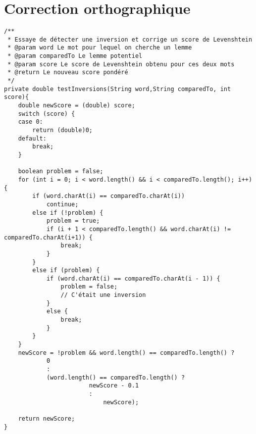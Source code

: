 \chapter{Correction orthographique}\label{corr}

\java
\begin{lstlisting}
/**
 * Essaye de détecter une inversion et corrige un score de Levenshtein
 * @param word Le mot pour lequel on cherche un lemme
 * @param comparedTo Le lemme potentiel
 * @param score Le score de Levenshtein obtenu pour ces deux mots
 * @return Le nouveau score pondéré
 */
private double testInversions(String word,String comparedTo, int score){
	double newScore = (double) score;
	switch (score) {
	case 0:
		return (double)0;
	default:
		break;
	}

	boolean problem = false;
	for (int i = 0; i < word.length() && i < comparedTo.length(); i++) {
		if (word.charAt(i) == comparedTo.charAt(i))
			continue;
		else if (!problem) {
			problem = true;
			if (i + 1 < comparedTo.length() && word.charAt(i) != comparedTo.charAt(i+1)) {
				break;
			}
		}
		else if (problem) {
			if (word.charAt(i) == comparedTo.charAt(i - 1)) {
				problem = false;
				// C'était une inversion
			}
			else {
				break;
			}
		}
	}
	newScore = !problem && word.length() == comparedTo.length() ?
			0
			:
			(word.length() == comparedTo.length() ?
						newScore - 0.1
						:
							newScore);

	return newScore;
}
\end{lstlisting}

